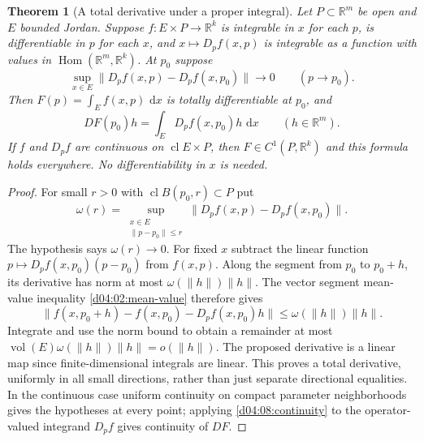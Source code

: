 \documentclass[11pt,oneside,openany]{book}
\newtheorem{theorem}{Theorem}[chapter]
\theoremstyle{definition}
\theoremstyle{remark}
\newcommand{\R}{\mathbb R}
\newcommand{\norm}[1]{\lVert#1\rVert}
\newcommand{\dd}{\,\mathrm d}
\DeclareMathOperator{\Hom}{Hom}
\DeclareMathOperator{\vol}{vol}
\DeclareMathOperator{\cl}{cl}
\newcommand{\family}[1]{}
\begin{document}
\family{K04.08.02}\family{K04.08.03}
\begin{theorem}[A total derivative under a proper integral]\label{d04:08:proper-derivative}
Let $P\subset\R^m$ be open and $E$ bounded Jordan. Suppose $f:E\times P\to\R^k$ is integrable in $x$ for each $p$, is differentiable in $p$ for each $x$, and $x\mapsto D_pf(x,p)$ is integrable as a function with values in $\Hom(\R^m,\R^k)$. At $p_0$ suppose
\[
 \sup_{x\in E}\norm{D_pf(x,p)-D_pf(x,p_0)}\longrightarrow0\qquad(p\to p_0).
\]
Then $F(p)=\int_E f(x,p)\,\dd x$ is totally differentiable at $p_0$, and
\[
 DF(p_0)h=\int_E D_pf(x,p_0)h\,\dd x\qquad(h\in\R^m).
\]
If $f$ and $D_pf$ are continuous on $\cl E\times P$, then $F\in C^1(P,\R^k)$ and this formula holds everywhere. No differentiability in $x$ is needed.
\end{theorem}
\begin{proof}
For small $r>0$ with $\cl B(p_0,r)\subset P$ put
\[
 \omega(r)=\sup_{\substack{x\in E\\\norm{p-p_0}\leq r}}
 \norm{D_pf(x,p)-D_pf(x,p_0)}.
\]
The hypothesis says $\omega(r)\to0$. For fixed $x$ subtract the linear function $p\mapsto D_pf(x,p_0)(p-p_0)$ from $f(x,p)$. Along the segment from $p_0$ to $p_0+h$, its derivative has norm at most $\omega(\norm h)\norm h$. The vector segment mean-value inequality \cref{d04:02:mean-value} therefore gives
\[
 \norm{f(x,p_0+h)-f(x,p_0)-D_pf(x,p_0)h}\leq\omega(\norm h)\norm h.
\]
Integrate and use the norm bound to obtain a remainder at most $\vol(E)\omega(\norm h)\norm h=o(\norm h)$. The proposed derivative is a linear map since finite-dimensional integrals are linear. This proves a total derivative, uniformly in all small directions, rather than just separate directional equalities. In the continuous case uniform continuity on compact parameter neighborhoods gives the hypotheses at every point; applying \cref{d04:08:continuity} to the operator-valued integrand $D_pf$ gives continuity of $DF$.
\end{proof}
\end{document}
